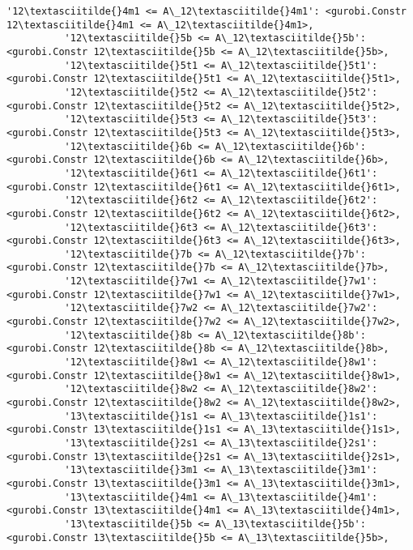 \documentclass[11pt]{article}
\begin{document}
\begin{Verbatim}[commandchars=\\\{\}]
          '12\textasciitilde{}4m1 <= A\_12\textasciitilde{}4m1': <gurobi.Constr 12\textasciitilde{}4m1 <= A\_12\textasciitilde{}4m1>,
          '12\textasciitilde{}5b <= A\_12\textasciitilde{}5b': <gurobi.Constr 12\textasciitilde{}5b <= A\_12\textasciitilde{}5b>,
          '12\textasciitilde{}5t1 <= A\_12\textasciitilde{}5t1': <gurobi.Constr 12\textasciitilde{}5t1 <= A\_12\textasciitilde{}5t1>,
          '12\textasciitilde{}5t2 <= A\_12\textasciitilde{}5t2': <gurobi.Constr 12\textasciitilde{}5t2 <= A\_12\textasciitilde{}5t2>,
          '12\textasciitilde{}5t3 <= A\_12\textasciitilde{}5t3': <gurobi.Constr 12\textasciitilde{}5t3 <= A\_12\textasciitilde{}5t3>,
          '12\textasciitilde{}6b <= A\_12\textasciitilde{}6b': <gurobi.Constr 12\textasciitilde{}6b <= A\_12\textasciitilde{}6b>,
          '12\textasciitilde{}6t1 <= A\_12\textasciitilde{}6t1': <gurobi.Constr 12\textasciitilde{}6t1 <= A\_12\textasciitilde{}6t1>,
          '12\textasciitilde{}6t2 <= A\_12\textasciitilde{}6t2': <gurobi.Constr 12\textasciitilde{}6t2 <= A\_12\textasciitilde{}6t2>,
          '12\textasciitilde{}6t3 <= A\_12\textasciitilde{}6t3': <gurobi.Constr 12\textasciitilde{}6t3 <= A\_12\textasciitilde{}6t3>,
          '12\textasciitilde{}7b <= A\_12\textasciitilde{}7b': <gurobi.Constr 12\textasciitilde{}7b <= A\_12\textasciitilde{}7b>,
          '12\textasciitilde{}7w1 <= A\_12\textasciitilde{}7w1': <gurobi.Constr 12\textasciitilde{}7w1 <= A\_12\textasciitilde{}7w1>,
          '12\textasciitilde{}7w2 <= A\_12\textasciitilde{}7w2': <gurobi.Constr 12\textasciitilde{}7w2 <= A\_12\textasciitilde{}7w2>,
          '12\textasciitilde{}8b <= A\_12\textasciitilde{}8b': <gurobi.Constr 12\textasciitilde{}8b <= A\_12\textasciitilde{}8b>,
          '12\textasciitilde{}8w1 <= A\_12\textasciitilde{}8w1': <gurobi.Constr 12\textasciitilde{}8w1 <= A\_12\textasciitilde{}8w1>,
          '12\textasciitilde{}8w2 <= A\_12\textasciitilde{}8w2': <gurobi.Constr 12\textasciitilde{}8w2 <= A\_12\textasciitilde{}8w2>,
          '13\textasciitilde{}1s1 <= A\_13\textasciitilde{}1s1': <gurobi.Constr 13\textasciitilde{}1s1 <= A\_13\textasciitilde{}1s1>,
          '13\textasciitilde{}2s1 <= A\_13\textasciitilde{}2s1': <gurobi.Constr 13\textasciitilde{}2s1 <= A\_13\textasciitilde{}2s1>,
          '13\textasciitilde{}3m1 <= A\_13\textasciitilde{}3m1': <gurobi.Constr 13\textasciitilde{}3m1 <= A\_13\textasciitilde{}3m1>,
          '13\textasciitilde{}4m1 <= A\_13\textasciitilde{}4m1': <gurobi.Constr 13\textasciitilde{}4m1 <= A\_13\textasciitilde{}4m1>,
          '13\textasciitilde{}5b <= A\_13\textasciitilde{}5b': <gurobi.Constr 13\textasciitilde{}5b <= A\_13\textasciitilde{}5b>,

\end{Verbatim}
\end{document}
